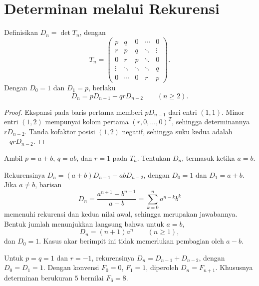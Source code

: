 \section{Determinan melalui Rekurensi}
\label{det:rekurensi}

\begin{prop}
      Definisikan $D_n=\det T_n$, dengan
      \[
            T_n=\begin{pmatrix}
                  p      & q      & 0      & \cdots & 0      \\
                  r      & p      & q      & \ddots & \vdots \\
                  0      & r      & p      & \ddots & 0      \\
                  \vdots & \ddots & \ddots & \ddots & q      \\
                  0      & \cdots & 0      & r      & p
            \end{pmatrix}.
      \]
      Dengan $D_0=1$ dan $D_1=p$, berlaku
      \[
            D_n=pD_{n-1}-qrD_{n-2}\qquad(n\ge2).
      \]
\end{prop}
\begin{proof}
      Ekspansi pada baris pertama memberi $pD_{n-1}$ dari entri $(1,1)$.
      Minor entri $(1,2)$ mempunyai kolom pertama $(r,0,\ldots,0)^T$,
      sehingga determinannya $rD_{n-2}$. Tanda kofaktor posisi $(1,2)$
      negatif, sehingga suku kedua adalah $-qrD_{n-2}$.
\end{proof}

\begin{exam}
      Ambil $p=a+b$, $q=ab$, dan $r=1$ pada $T_n$.
      Tentukan $D_n$, termasuk ketika $a=b$.
\end{exam}
\begin{solution}
      Rekurensinya
      $D_n=(a+b)D_{n-1}-abD_{n-2}$, dengan $D_0=1$ dan $D_1=a+b$.
      Jika $a\ne b$, barisan
      \[
            D_n=\frac{a^{n+1}-b^{n+1}}{a-b}
            =\sum_{k=0}^n a^{n-k}b^k
      \]
      memenuhi rekurensi dan kedua nilai awal, sehingga merupakan jawabannya.
      Bentuk jumlah menunjukkan langsung bahwa untuk $a=b$,
      \[
            D_n=(n+1)a^n\qquad(n\ge1),
      \]
      dan $D_0=1$. Kasus akar berimpit ini tidak memerlukan pembagian oleh $a-b$.
\end{solution}

\begin{exam}
      Untuk $p=q=1$ dan $r=-1$, rekurensinya $D_n=D_{n-1}+D_{n-2}$,
      dengan $D_0=D_1=1$. Dengan konvensi $F_0=0$, $F_1=1$, diperoleh
      $D_n=F_{n+1}$. Khususnya determinan berukuran $5$ bernilai $F_6=8$.
\end{exam}

